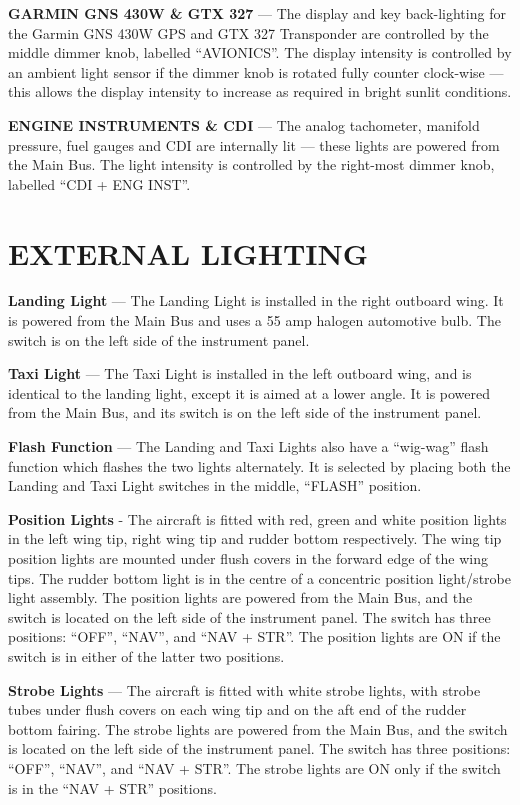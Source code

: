 \textbf{GARMIN GNS 430W \& GTX 327} --- The display and key back-lighting for the Garmin GNS 430W GPS and GTX 327 Transponder are controlled by the middle dimmer knob, labelled ``AVIONICS''. The display intensity is controlled by an ambient light sensor if the dimmer knob is rotated fully counter clock-wise --- this allows the display intensity to increase as required in bright sunlit conditions.

\textbf{ENGINE INSTRUMENTS \& CDI} --- The analog tachometer, manifold pressure, fuel gauges and CDI are internally lit --- these lights are powered from the Main Bus. The light intensity is controlled by the right-most dimmer knob, labelled ``CDI + ENG INST''.

\section{EXTERNAL LIGHTING}

\textbf{Landing Light} --- The Landing Light is installed in the right outboard wing. It is powered from the Main Bus and uses a 55 amp halogen automotive bulb. The switch is on the left side of the instrument panel.

\textbf{Taxi Light} --- The Taxi Light is installed in the left outboard wing, and is identical to the landing light, except it is aimed at a lower angle. It is powered from the Main Bus, and its switch is on the left side of the instrument panel.

\textbf{Flash Function} --- The Landing and Taxi Lights also have a ``wig-wag'' flash function which flashes the two lights alternately. It is selected by placing both the Landing and Taxi Light switches in the middle, ``FLASH'' position.

\textbf{Position Lights }- The aircraft is fitted with red, green and white position lights in the left wing tip, right wing tip and rudder bottom respectively. The wing tip position lights are mounted under flush covers in the forward edge of the wing tips. The rudder bottom light is in the centre of a concentric position light/strobe light assembly. The position lights are powered from the Main Bus, and the switch is located on the left side of the instrument panel. The switch has three positions: ``OFF'', ``NAV'', and ``NAV + STR''. The position lights are ON if the switch is in either of the latter two positions.

\textbf{Strobe Lights} --- The aircraft is fitted with white strobe lights, with strobe tubes under flush covers on each wing tip and on the aft end of the rudder bottom fairing. The strobe lights are powered from the Main Bus, and the switch is located on the left side of the instrument panel. The switch has three positions: ``OFF'', ``NAV'', and ``NAV + STR''. The strobe lights are ON only if the switch is in the ``NAV + STR'' positions.

